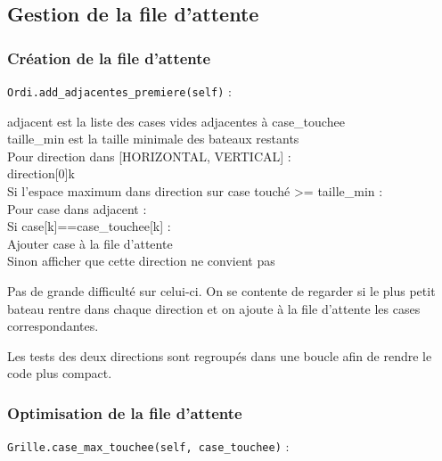 \newpage

\subsection{Gestion de la file d'attente}
\subsubsection{Création de la file d'attente}\label{add_adjacentes_premiere}
\texttt{Ordi.add\_adjacentes\_premiere(self)} :
\begin{algo1}
adjacent est la liste des cases vides adjacentes à case\_touchee\\
taille\_min est la taille minimale des bateaux restants\\
Pour direction dans [HORIZONTAL, VERTICAL] :\\
direction[0]\sto k\\
Si l'espace maximum dans direction sur case touché >= taille\_min :\\
Pour case dans adjacent :\\
Si case[k]==case\_touchee[k] :\\
Ajouter case à la file d'attente\\
Sinon afficher que cette direction ne convient pas\\
\end{algo1}

Pas de grande difficulté sur celui-ci. On se contente de regarder si le plus petit bateau rentre dans chaque direction et on ajoute à la file d'attente les cases correspondantes.

Les tests des deux directions sont regroupés dans une boucle afin de rendre le code plus compact.
\newpage
\subsubsection{Optimisation de la file d'attente}\label{case_max_touchee}
\texttt{Grille.case\_max\_touchee(self, case\_touchee)} :

